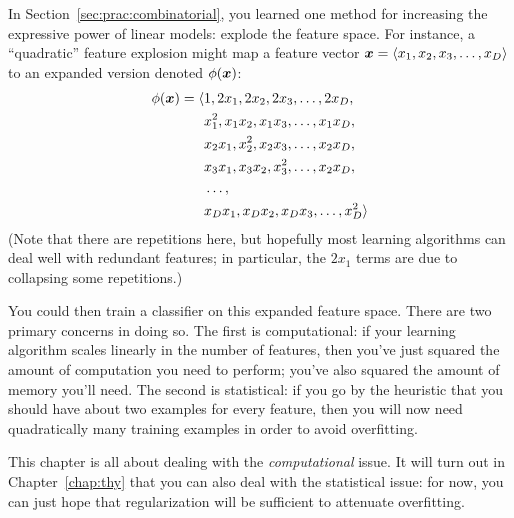 In Section~\ref{sec:prac:combinatorial}, you learned one method for
increasing the expressive power of linear models: explode the feature
space.  For instance, a ``quadratic'' feature explosion might map a
feature vector ${\boldsymbol{x}} = \langle x_1, x_2, x_3, \dots, x_D \rangle$ to an
expanded version denoted $\phi({\boldsymbol{x}})$:
%
\begin{align}
  \phi({\boldsymbol{x}}) = \langle &1, 2x_1, 2x_2, 2x_3, \dots, 2x_D, \nonumber\\
  & x_1^2, x_1 x_2, x_1 x_3, \dots, x_1 x_D, \nonumber\\
  & x_2 x_1, x_2^2, x_2 x_3, \dots, x_2 x_D, \nonumber\\
  & x_3 x_1, x_3 x_2, x_3^2, \dots, x_2 x_D, \nonumber\\
  & \dots, \nonumber\\
  & x_D x_1, x_D x_2, x_D x_3, \dots, x_D^2 \rangle
\end{align}
%
(Note that there are repetitions here, but hopefully most learning
algorithms can deal well with redundant features; in particular, the
$2x_1$ terms are due to collapsing some repetitions.)

You could then train a classifier on this expanded feature space.
There are two primary concerns in doing so.  The first is
computational: if your learning algorithm scales linearly in the
number of features, then you've just squared the amount of computation
you need to perform; you've also squared the amount of memory you'll
need.  The second is statistical: if you go by the heuristic that you
should have about two examples for every feature, then you will now
need quadratically many training examples in order to avoid
overfitting.

This chapter is all about dealing with the \emph{computational} issue.
It will turn out in Chapter~\ref{chap:thy} that you can also deal with
the statistical issue: for now, you can just hope that regularization
will be sufficient to attenuate overfitting.

